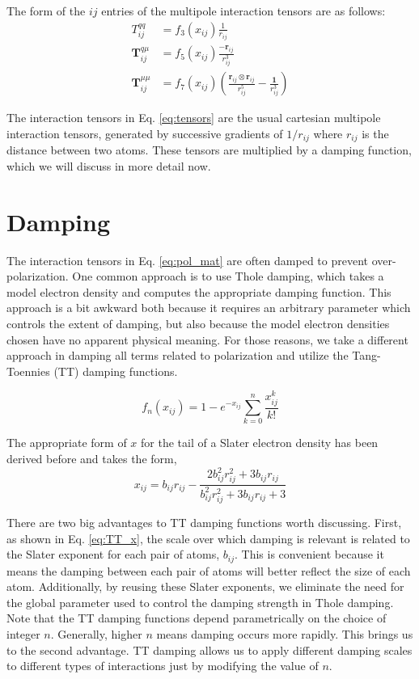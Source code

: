 \documentclass[journal=jacsat,manuscript=article]{achemso}
\begin{document}
The form of the $ij$ entries of the multipole interaction tensors are as follows:
\begin{align}
  T^{qq}_{ij}&=f_3(x_{ij})\frac{1}{r_{ij}} \\
  \bm{T}^{q\mu}_{ij}&=f_5(x_{ij})\frac{-\bm{r}_{ij}}{r_{ij}^3} \\
  \bm{T}^{\mu\mu}_{ij}&=f_7(x_{ij})\left(\frac{\bm{r}_{ij}\otimes\bm{r}_{ij}}{r_{ij}^5}-\frac{\bm{1}}{r_{ij}^3}\right)
  \label{eq:tensors}
\end{align}

The interaction tensors in Eq. \ref{eq:tensors} are the usual cartesian multipole interaction
tensors, generated by successive gradients of $1/r_{ij}$ where $r_{ij}$ is the distance between
two atoms. These tensors are multiplied by a damping function, which we will discuss in more detail
now.

\section*{Damping}

The interaction tensors in Eq. \ref{eq:pol_mat} are often
damped to prevent over-polarization. One common approach is to use Thole damping\cite{thole1981molecular},
which takes a model electron density and computes the appropriate damping function. This approach is
a bit awkward both because it requires an arbitrary parameter which controls the extent of damping,
but also because the model electron densities chosen have no apparent physical meaning.
For those reasons, we take a different approach in damping all terms related to polarization and
utilize the Tang-Toennies (TT) damping functions\cite{tang1984improved}.

\begin{equation}
  f_n(x_{ij}) = 1-e^{-x_{ij}}\sum_{k=0}^n\frac{x_{ij}^k}{k!}
  \label{eq:TT}
\end{equation}

The appropriate form of $x$ for the tail of a Slater electron density
has been derived before\cite{van2016beyond} and takes the form,
\begin{equation}
  x_{ij}=b_{ij}r_{ij}-\frac{2b_{ij}^2r_{ij}^2+3b_{ij}r_{ij}}{b_{ij}^2r_{ij}^2+3b_{ij}r_{ij}+3}
  \label{eq:TT_x}
\end{equation}

There are two big advantages to TT damping functions worth discussing. First, as
shown in Eq. \ref{eq:TT_x}, the scale over which damping is relevant is related to the
Slater exponent for each pair of atoms, $b_{ij}$. This is convenient because it means the
damping between each pair of atoms will better reflect the size of each atom. Additionally,
by reusing these Slater exponents, we eliminate the need for the global parameter used
to control the damping strength in Thole damping. Note that the TT damping functions
depend parametrically on the choice of integer $n$. Generally, higher $n$ means
damping occurs more rapidly. This brings us to the second advantage. TT damping
allows us to apply different damping scales to different types of interactions
just by modifying the value of $n$.
\end{document}
